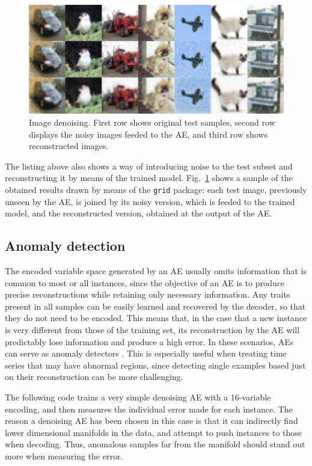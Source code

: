 \begin{figure}[ht]
    \centering
    \includegraphics[width=\textwidth]{denoising_cifar10.pdf}
    \caption{Image denoising. First row shows original test samples, second row displays the noisy images feeded to the AE, and third row shows reconstructed images.}
    \label{p4fig:denoising}
\end{figure}

The listing above also shows a way of introducing noise to the test subset and reconstructing it by means of the trained model. Fig.~\ref{p4fig:denoising} shows a sample of the obtained results drawn by means of the \texttt{grid} package: each test image, previously unseen by the AE, is joined by its noisy version, which is feeded to the trained model, and the reconstructed version, obtained at the output of the AE.


\subsection{Anomaly detection}
\label{p4sec.anomaly}

The encoded variable space generated by an AE usually omits information that is common to most or all instances, since the objective of an AE is to produce precise reconstructions while retaining only necessary information. Any traits present in all samples can be easily learned and recovered by the decoder, so that they do not need to be encoded. This means that, in the case that a new instance is very different from those of the training set, its reconstruction by the AE will predictably lose information and produce a high error. In these scenarios, AEs can serve as anomaly detectors \cite{sakurada,park}. This is especially useful when treating time series that may have abnormal regions, since detecting single examples based just on their reconstruction can be more challenging.

The following code trains a very simple denoising AE with a 16-variable encoding, and then measures the individual error made for each instance. The reason a denoising AE has been chosen in this case is that it can indirectly find lower dimensional manifolds in the data, and attempt to push instances to those when decoding. Thus, anomalous samples far from the manifold should stand out more when measuring the error.

